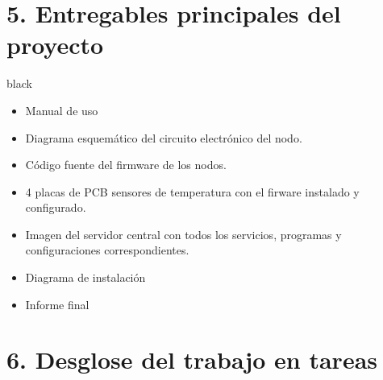 \documentclass[11pt]{charter}
\begin{document}
\section{5. Entregables principales del proyecto}
\label{sec:entregables}

\begin{consigna}{black}
\begin{itemize}
\item Manual de uso
\item Diagrama esquemático del circuito electrónico del nodo.
\item Código fuente del firmware de los nodos.
\item 4 placas de PCB sensores de temperatura con el firware instalado y configurado.
\item Imagen del servidor central con todos los servicios, programas y configuraciones correspondientes.
\item Diagrama de instalación
\item Informe final

\end{itemize}

\end{consigna}

\section{6. Desglose del trabajo en tareas}
\label{sec:wbs}
\end{document}
